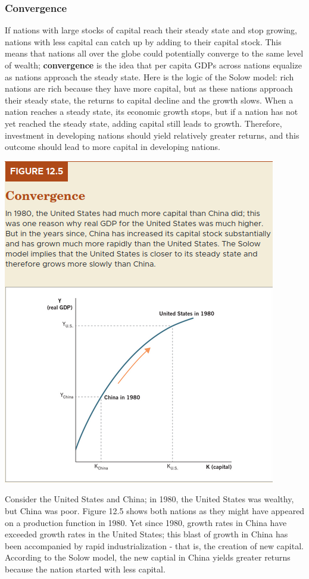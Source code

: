 \documentclass[11pt]{article} %
\begin{document}
\subsubsection*{Convergence}
If nations with large stocks of capital reach their steady state and stop growing, nations with less capital can catch up by adding to their capital stock. This means that nations all over the globe could potentially converge to the same level of wealth; \textbf{convergence} is the idea that per capita GDPs across nations equalize as nations approach the steady state. Here is the logic of the Solow model: rich nations are rich because they have more capital, but as these nations approach their steady state, the returns to capital decline and the growth slows. When a nation reaches a steady state, its economic growth stops, but if a nation has not yet reached the steady state, adding capital still leads to growth. Therefore, investment in developing nations should yield relatively greater returns, and this outcome should lead to more capital in developing nations.
\begin{center}
\includegraphics[scale=0.5]{Images/Figure 12.5.png}
\end{center}
Consider the United States and China; in 1980, the United States was wealthy, but China was poor. Figure 12.5 shows both nations as they might have appeared on a production function in 1980. Yet since 1980, growth rates in China have exceeded growth rates in the United States; this blast of growth in China has been accompanied by rapid industrialization - that is, the creation of new capital. According to the Solow model, the new captial in China yields greater returns because the nation started with less capital.
\end{document}
